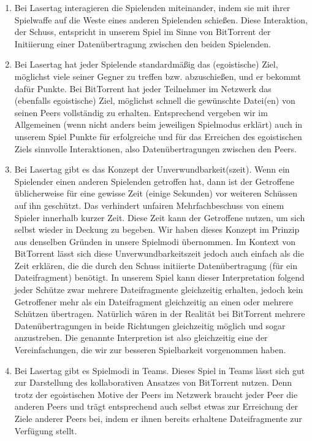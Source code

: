 \begin{enumerate}
\item Bei Lasertag interagieren die Spielenden miteinander, indem sie mit ihrer Spielwaffe auf die Weste eines anderen Spielenden schießen. Diese Interaktion, der Schuss, entspricht in unserem Spiel im Sinne von BitTorrent der Initiierung einer Datenübertragung zwischen den beiden Spielenden.

\item Bei Lasertag hat jeder Spielende standardmäßig das (egoistische) Ziel, möglichst viele seiner Gegner zu treffen bzw. abzuschießen, und er bekommt dafür Punkte. Bei BitTorrent hat jeder Teilnehmer im Netzwerk das (ebenfalls egoistische) Ziel, möglichst schnell die gewünschte Datei(en) von seinen Peers vollständig zu erhalten. Entsprechend vergeben wir im Allgemeinen (wenn nicht anders beim jeweiligen Spielmodus erklärt) auch in unserem Spiel Punkte für erfolgreiche und für das Erreichen des egoistischen Ziels sinnvolle Interaktionen, also Datenübertragungen zwischen den Peers.

\item Bei Lasertag gibt es das Konzept der Unverwundbarkeit(szeit). Wenn ein Spielender einen anderen Spielenden getroffen hat, dann ist der Getroffene üblicherweise für eine gewisse Zeit (einige Sekunden) vor weiteren Schüssen auf ihn geschützt. Das verhindert unfairen Mehrfachbeschuss von einem Spieler innerhalb kurzer Zeit. Diese Zeit kann der Getroffene nutzen, um sich selbst wieder in Deckung zu begeben. Wir haben dieses Konzept im Prinzip aus denselben Gründen in unsere Spielmodi übernommen. Im Kontext von BitTorrent lässt sich diese Unverwundbarkeitszeit jedoch auch einfach als die Zeit erklären, die die durch den Schuss initiierte Datenübertragung (für ein Dateifragment) benötigt. In unserem Spiel kann dieser Interpretation folgend jeder Schütze zwar mehrere Dateifragmente gleichzeitig erhalten, jedoch kein Getroffener mehr als ein Dateifragment gleichzeitig an einen oder mehrere Schützen übertragen. Natürlich wären in der Realität bei BitTorrent mehrere Datenübertragungen in beide Richtungen gleichzeitig möglich und sogar anzustreben. Die genannte Interpretion ist also gleichzeitig eine der Vereinfachungen, die wir zur besseren Spielbarkeit vorgenommen haben.

\item Bei Lasertag gibt es Spielmodi in Teams. Dieses Spiel in Teams lässt sich gut zur Darstellung des kollaborativen Ansatzes von BitTorrent nutzen. Denn trotz der egoistischen Motive der Peers im Netzwerk braucht jeder Peer die anderen Peers und trägt entsprechend auch selbst etwas zur Erreichung der Ziele anderer Peers bei, indem er ihnen bereits erhaltene Dateifragmente zur Verfügung stellt.
\end{enumerate}

